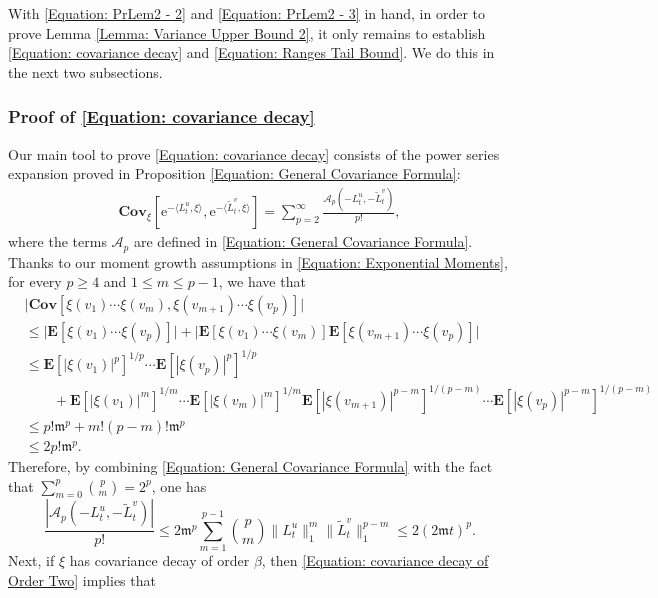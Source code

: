 \documentclass{amsart}
\numberwithin{equation}{section}
\theoremstyle{definition}
\newcommand\be{\beta}
\newcommand\mbf{\mathbf}
\newcommand\mc{\mathcal}
\newcommand\mf{\mathfrak}
\newcommand\mr{\mathrm}
\begin{document}
%

With \eqref{Equation: PrLem2 - 2} and \eqref{Equation: PrLem2 - 3} in hand,
in order to prove Lemma \ref{Lemma: Variance Upper Bound 2}, it only remains
to establish \eqref{Equation: covariance decay} and \eqref{Equation: Ranges Tail Bound}.
We do this in the next two subsections.

%

\subsubsection{Proof of \eqref{Equation: covariance decay}}
\label{Section: Covariance Decay Step 1}

%

Our main tool to prove \eqref{Equation: covariance decay} consists of the power series expansion
proved in Proposition \ref{Equation: General Covariance Formula}:
\begin{align}
\label{Equation: Covariance Expansion}
\mbf{Cov}_\xi\left[\mr e^{-\langle L_t^u,\xi\rangle},\mr e^{-\langle\tilde L_t^v,\xi\rangle}\right]=\sum_{p=2}^\infty\frac{\mc A_p(-L^u_t,-\tilde L^v_t)}{p!},
\end{align}
where the terms $\mc A_p$ are defined in \eqref{Equation: General Covariance Formula}.
Thanks to our moment growth assumptions in \eqref{Equation: Exponential Moments}, for every $p\geq4$ and $1\leq m\leq p-1$, we have that
\begin{align*}
&\big|\mbf{Cov}[\xi(v_1)\cdots\xi(v_m),\xi(v_{m+1})\cdots\xi(v_p)]\big|\\
&\leq\big|\mbf E[\xi(v_1)\cdots\xi(v_p)]\big|+\big|\mbf E[\xi(v_1)\cdots\xi(v_m)]\mbf E[\xi(v_{m+1})\cdots\xi(v_p)]\big|\\
&\leq\mbf E[|\xi(v_1)|^p]^{1/p}\cdots\mbf E[|\xi(v_p)|^p]^{1/p}\\
&\qquad+\mbf E[|\xi(v_1)|^m]^{1/m}\cdots\mbf E[|\xi(v_m)|^m]^{1/m}\mbf E[|\xi(v_{m+1})|^{p-m}]^{1/(p-m)}\cdots\mbf E[|\xi(v_p)|^{p-m}]^{1/(p-m)}\\
&\leq p!\mf m^p+m!(p-m)!\mf m^p\\
&\leq2p!\mf m^p.
\end{align*}
Therefore, by combining \eqref{Equation: General Covariance Formula}
with the fact that $\sum_{m=0}^p{p\choose m}=2^p$, one has
\[\frac{|\mc A_p(-L_t^u,-\tilde L_t^v)|}{p!}\leq2\mf m^p\sum_{m=1}^{p-1}{p\choose m}\|L_t^u\|_{1}^m\|\tilde L_t^v\|_{1}^{p-m}
\leq 2(2\mf m t)^p.\]
Next, if $\xi$ has covariance decay of order $\be$, then
\eqref{Equation: covariance decay of Order Two} implies that
\end{document}
